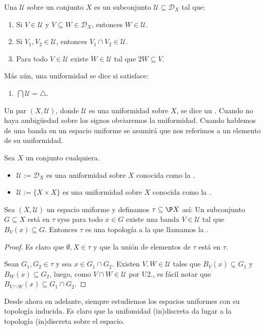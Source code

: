 \documentclass[topologia-analisis.tex]{subfiles}
\begin{document}
\begin{mydefi}
	Una  $\mathcal{U}$ sobre un conjunto $X$ es un subconjunto $\mathcal{U} \subseteq \mathcal{D}_X$ tal que:
	\begin{enumerate}[{U}1.]
		\item Si $V \in \mathcal{U}$ y $V \subseteq W \in \mathcal{D}_X$, entonces $W \in \mathcal{U}$.
		\item Si $V_1, V_2 \in \mathcal{U}$, entonces $V_1\cap V_2 \in \mathcal{U}$.
		\item Para todo $V \in \mathcal{U}$ existe $W \in \mathcal{U}$ tal que $2W \subseteq V$.
	\end{enumerate}
	Más aún, una uniformidad se dice  si satisface:
	\begin{enumerate}[{U}4.*]
		\item $\bigcap \mathcal{U} = \triangle$.
	\end{enumerate}
	Un par $(X, \mathcal{U})$, donde $\mathcal{U}$ es una uniformidad sobre $X$, se dice un .
	Cuando no haya ambigüedad sobre los signos obviaremos la uniformidad.
	Cuando hablemos de una banda en un espacio uniforme se asumirá que nos referimos a un elemento de su uniformidad.
\end{mydefi}
\begin{ex}
	Sea $X$ un conjunto cualquiera.
	\begin{itemize}
		\item $\mathcal{U} := \mathcal{D}_X$ es una uniformidad sobre $X$ conocida como la .
		\item $\mathcal{U} := \{X\times X\}$ es una uniformidad sobre $X$ conocida como la .
	\end{itemize}
\end{ex}

\begin{prop}
	Sea $(X, \mathcal{U})$ un espacio uniforme y definamos $\tau \subseteq \P X$ así:
	Un subconjunto $G \subseteq X$ está en $\tau$ syss para todo $x \in G$ existe una banda $V \in \mathcal{U}$ tal que $B_V(x) \subseteq G$.
	Entonces $\tau$ es una topología a la que llamamos la .
\end{prop}
\begin{proof}
	Es claro que $\emptyset, X \in \tau$ y que la unión de elementos de $\tau$ está en $\tau$.

	Sean $G_1, G_2 \in \tau$ y sea $x \in G_1\cap G_2$. Existen $V, W \in \mathcal{U}$ tales que $B_V(x) \subseteq G_1$ y $B_W(x) \subseteq G_2$,
	luego, como $V\cap W \in \mathcal{U}$ por U2., es fácil notar que $B_{V\cap W}(x) \subseteq G_1\cap G_2$.
\end{proof}
Desde ahora en adelante, siempre estudiemos los espacios uniformes con su topología inducida.
Es claro que la unifomidad (in)discreta da lugar a la topología (in)discreta sobre el espacio.
\end{document}
